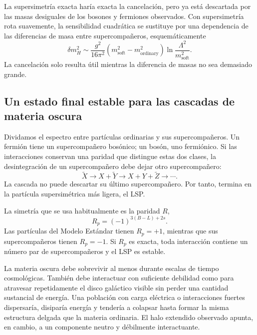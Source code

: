 La supersimetría exacta haría exacta la cancelación, pero ya está descartada por las masas desiguales de los bosones y fermiones observados. Con supersimetría rota suavemente, la sensibilidad cuadrática se sustituye por una dependencia de las diferencias de masa entre supercompañeros, esquemáticamente
\begin{equation}
\delta m_H^2
\sim
\frac{g^2}{16\pi^2}
\left(m_{\mathrm{soft}}^2-m_{\mathrm{ordinary}}^2\right)
\ln\frac{\Lambda^2}{m_{\mathrm{soft}}^2}.
\end{equation}
La cancelación solo resulta útil mientras la diferencia de masas no sea demasiado grande.

\subsection{Un estado final estable para las cascadas de materia oscura}

Dividamos el espectro entre partículas ordinarias y sus supercompañeros. Un fermión tiene un supercompañero bosónico; un bosón, uno fermiónico. Si las interacciones conservan una paridad que distingue estas dos clases, la desintegración de un supercompañero debe dejar otro supercompañero:
\begin{equation}
\widetilde X
\longrightarrow X+\widetilde Y
\longrightarrow X+Y+\widetilde Z
\longrightarrow\cdots.
\end{equation}
La cascada no puede descartar su último supercompañero. Por tanto, termina en la partícula supersimétrica más ligera, el LSP.

La simetría que se usa habitualmente es la paridad \(R\),
\begin{equation}
R_p=(-1)^{3(B-L)+2s}.
\end{equation}
Las partículas del Modelo Estándar tienen \(R_p=+1\), mientras que sus supercompañeros tienen \(R_p=-1\). Si \(R_p\) es exacta, toda interacción contiene un número par de supercompañeros y el LSP es estable.

La materia oscura debe sobrevivir al menos durante escalas de tiempo cosmológicas. También debe interactuar con suficiente debilidad como para atravesar repetidamente el disco galáctico visible sin perder una cantidad sustancial de energía. Una población con carga eléctrica o interacciones fuertes dispersaría, disiparía energía y tendería a colapsar hasta formar la misma estructura delgada que la materia ordinaria. El halo extendido observado apunta, en cambio, a un componente neutro y débilmente interactuante.

